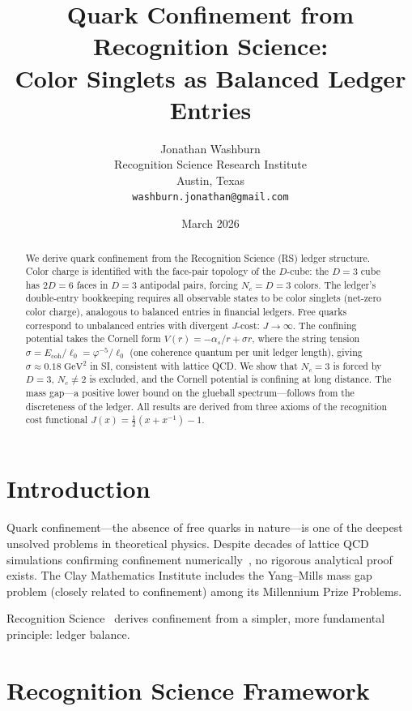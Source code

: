 \documentclass[12pt,a4paper]{article}
\title{Quark Confinement from Recognition Science:\\
Color Singlets as Balanced Ledger Entries}
\author{Jonathan Washburn\\
Recognition Science Research Institute\\
Austin, Texas\\
\texttt{washburn.jonathan@gmail.com}}
\date{March 2026}
\theoremstyle{definition}
\theoremstyle{remark}
\begin{document}
\maketitle

\begin{abstract}
We derive quark confinement from the Recognition Science (RS)
ledger structure.  Color charge is identified with the face-pair
topology of the $D$-cube: the $D = 3$ cube has $2D = 6$ faces
in $D = 3$ antipodal pairs, forcing $N_c = D = 3$ colors.
The ledger's double-entry bookkeeping requires all observable
states to be color singlets (net-zero color charge), analogous
to balanced entries in financial ledgers.  Free quarks correspond
to unbalanced entries with divergent $J$-cost: $J \to \infty$.
The confining potential takes the Cornell form
$V(r) = -\alpha_s/r + \sigma r$, where the string tension
$\sigma = E_{\mathrm{coh}}/\ell_0 = \varphi^{-5}/\ell_0$ (one coherence
quantum per unit ledger length),
giving $\sigma \approx 0.18\;\mathrm{GeV}^2$ in SI, consistent
with lattice QCD.  We show that $N_c = 3$ is forced by $D = 3$,
$N_c \neq 2$ is excluded, and the Cornell potential is confining
at long distance.  The mass gap---a positive lower bound on the
glueball spectrum---follows from the discreteness of the ledger.
All results are derived from three axioms of the recognition cost
functional $J(x) = \tfrac{1}{2}(x + x^{-1}) - 1$.
\end{abstract}

\section{Introduction}
\label{sec:intro}

Quark confinement---the absence of free quarks in nature---is
one of the deepest unsolved problems in theoretical physics.
Despite decades of lattice QCD simulations confirming confinement
numerically~\cite{Wilson1974}, no rigorous analytical proof
exists.  The Clay Mathematics Institute includes the Yang--Mills
mass gap problem (closely related to confinement) among its
Millennium Prize Problems.

Recognition Science~\cite{RS_Axioms} derives confinement from a
simpler, more fundamental principle: ledger balance.

\section{Recognition Science Framework}
\label{sec:framework}
\end{document}
